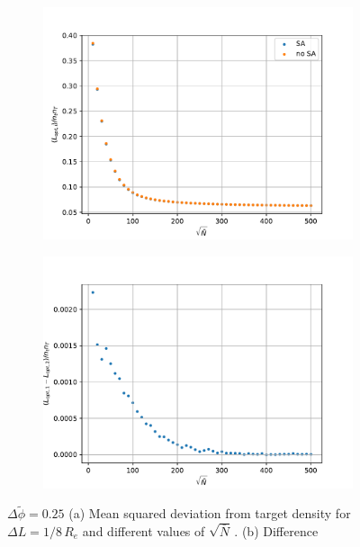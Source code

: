 \documentclass[bachelor,       %
               twoside,        %
               BCOR10mm,       %
               ngerman, english %
               ]{GAUBM}
\begin{document}
\begin{figure}[h]
  \centering
  \begin{subfigure}[b]{0.45\textwidth}
      \centering
      \includegraphics[width=\textwidth]{figures/opt_var_nbar_dphi0p5.pdf}
      \caption{}
      \label{fig:opt_var_nbar_dphi0p5}
  \end{subfigure}
    \hfill
  \begin{subfigure}[b]{0.45\textwidth}
      \centering
      \includegraphics[width=\textwidth]{figures/diff_var_nbar_dphi0p5.pdf}
      \caption{}
      \label{fig:diff_var_nbar_dphi0p5}
  \end{subfigure}
     \caption{$\Delta\tilde\phi=0.25 $ (a) Mean squared deviation from target density for $\Delta L=1/8\,R_e$ and different values of $\sqrt{\bar N}\,.$ (b) Difference}
     \label{fig:var_nbar_dphi0p5}
\end{figure}
\end{document}
